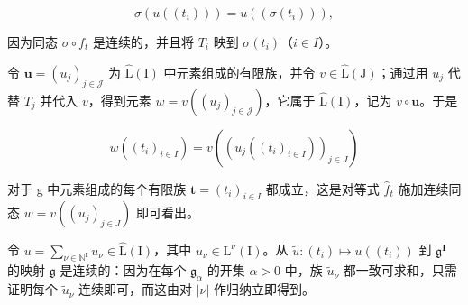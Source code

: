 \[
\sigma (u ((t _ {i}))) = u ((\sigma (t _ {i}))),\tag{6}
\]

因为同态 \(\sigma \circ f_t\) 是连续的，并且将 \(T_i\) 映到 \(\sigma(t_i)\)（\(i \in I\)）。

令 \(\boldsymbol{u} = (u_j)_{j \in \mathcal{J}}\) 为 \(\hat{\mathrm{L}}(\mathrm{I})\) 中元素组成的有限族，并令 \(v \in \hat{\mathrm{L}}(\mathrm{J})\)；通过用 \(u_j\) 代替 \(T_j\) 并代入 \(v\)，得到元素 \(w = v((u_j)_{j \in \mathcal{J}})\)，它属于 \(\hat{\mathrm{L}}(\mathrm{I})\)，记为 \(v \circ \boldsymbol{u}\)。于是

\[
w ((t _ {i}) _ {i \in I}) = v ((u _ {j} ((t _ {i}) _ {i \in I})) _ {j \in J})\tag{7}
\]

对于 g 中元素组成的每个有限族 \(\boldsymbol{t} = (t_{i})_{i \in I}\) 都成立，这是对等式 \(\hat{f}_{t}\) 施加连续同态 \(w = v((u_{j})_{j \in J})\) 即可看出。

令 \(u = \sum_{\nu \in \mathbb{N}^{\mathbf{I}}} u_{\nu} \in \hat{\mathrm{L}}(\mathrm{I})\)，其中 \(u_{\nu} \in \mathrm{L}^{\nu}(\mathrm{I})\)。从 \(\tilde{u}\colon (t_i)\mapsto u((t_i))\) 到 \(\mathfrak{g}^{\mathbf{I}}\) 的映射 \(\mathfrak{g}\) 是连续的：因为在每个 \(\mathfrak{g}_{\alpha}\) 的开集 \(\alpha > 0\) 中，族 \(\tilde{u}_{\nu}\) 都一致可求和，只需证明每个 \(\tilde{u}_{\nu}\) 连续即可，而这由对 \(|\nu|\) 作归纳立即得到。

